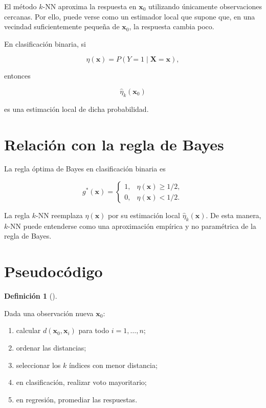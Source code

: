 \documentclass[
  spanish,
  11pt,
  letterpaper,
  DIV=11,
  numbers=noendperiod]{scrreprt}
\providecommand{\tightlist}{%
  \setlength{\itemsep}{0pt}\setlength{\parskip}{0pt}}
\theoremstyle{definition}
\newtheorem{definition}{Definición}[chapter]
\theoremstyle{plain}
\theoremstyle{definition}
\theoremstyle{remark}
\begin{document}
El método \(k\)-NN aproxima la respuesta en \(\mathbf{x}_0\) utilizando
únicamente observaciones cercanas. Por ello, puede verse como un
estimador local que supone que, en una vecindad suficientemente pequeña
de \(\mathbf{x}_0\), la respuesta cambia poco.

En clasificación binaria, si

\[
\eta(\mathbf{x})=P(Y=1\mid\mathbf{X}=\mathbf{x}),
\]

entonces

\[
\widehat{\eta}_k(\mathbf{x}_0)
\]

es una estimación local de dicha probabilidad.

\section{Relación con la regla de
Bayes}\label{relaciuxf3n-con-la-regla-de-bayes}

La regla óptima de Bayes en clasificación binaria es

\[
g^*(\mathbf{x})
=
\begin{cases}
1, & \eta(\mathbf{x})\ge 1/2,\\
0, & \eta(\mathbf{x})<1/2.
\end{cases}
\]

La regla \(k\)-NN reemplaza \(\eta(\mathbf{x})\) por su estimación local
\(\widehat{\eta}_k(\mathbf{x})\). De esta manera, \(k\)-NN puede
entenderse como una aproximación empírica y no paramétrica de la regla
de Bayes.

\section{Pseudocódigo}\label{pseudocuxf3digo}

\begin{definition}[]\protect\hypertarget{def-pseudocodigo-knn}{}\label{def-pseudocodigo-knn}

Dada una observación nueva \(\mathbf{x}_0\):

\begin{enumerate}
\def\labelenumi{\arabic{enumi}.}
\tightlist
\item
  calcular \(d(\mathbf{x}_0,\mathbf{x}_i)\) para todo \(i=1,\ldots,n\);
\item
  ordenar las distancias;
\item
  seleccionar los \(k\) índices con menor distancia;
\item
  en clasificación, realizar voto mayoritario;
\item
  en regresión, promediar las respuestas.
\end{enumerate}

\end{definition}
\end{document}
